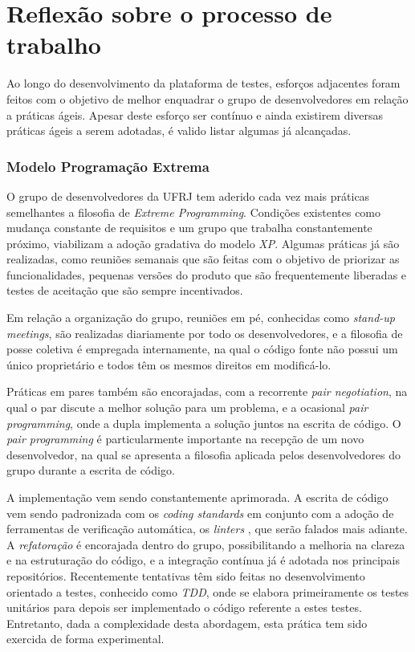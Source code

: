 \hypertarget{implementacao-de-praticas-ageis}{%
\section{Reflexão sobre o processo de trabalho}\label{implementacao-de-praticas-ageis}}

Ao longo do desenvolvimento da plataforma de testes, esforços adjacentes foram feitos com o objetivo de melhor enquadrar o grupo de desenvolvedores em relação a práticas ágeis. Apesar deste esforço ser contínuo e ainda existirem diversas práticas ágeis a serem adotadas, é valido listar algumas já alcançadas.

\hypertarget{modelo-extreme-programming}{%
\label{modelo-extreme-programming}}
\subsubsection{Modelo Programação Extrema}

O grupo de desenvolvedores da UFRJ tem aderido cada vez mais práticas semelhantes a filosofia de \emph{Extreme Programming}. Condições existentes como mudança constante de requisitos e um grupo que trabalha constantemente próximo, viabilizam a adoção gradativa do modelo \emph{XP}. Algumas práticas já são realizadas, como reuniões semanais que são feitas com o objetivo de priorizar as funcionalidades, pequenas versões do produto que são frequentemente liberadas e testes de aceitação que são sempre incentivados.

Em relação a organização do grupo, reuniões em pé, conhecidas como \emph{stand-up meetings}, são realizadas diariamente por todo os desenvolvedores, e a filosofia de posse coletiva é empregada internamente, na qual o código fonte não possui um único proprietário e todos têm os mesmos direitos em modificá-lo.

Práticas em pares também são encorajadas, com a recorrente \emph{pair negotiation}, na qual o par discute a melhor solução para um problema, e a ocasional \emph{pair programming}, onde a dupla implementa a solução juntos na escrita de código. O \emph{pair programming} é particularmente importante na recepção de um novo desenvolvedor, na qual se apresenta a filosofia aplicada pelos desenvolvedores do grupo durante a escrita de código.

A implementação vem sendo constantemente aprimorada. A escrita de código vem sendo padronizada com os \emph{coding standards} em conjunto com a adoção de ferramentas de verificação automática, os \emph{linters} , que serão falados mais adiante. A \emph{refatoração} é encorajada dentro do grupo, possibilitando a melhoria na clareza e na estruturação do código, e a integração contínua já é adotada nos principais repositórios. Recentemente tentativas têm sido feitas no desenvolvimento orientado a testes, conhecido como \emph{TDD}, onde se elabora primeiramente os testes unitários para depois ser implementado o código referente a estes testes. Entretanto, dada a complexidade desta abordagem, esta prática tem sido exercida de forma experimental.

